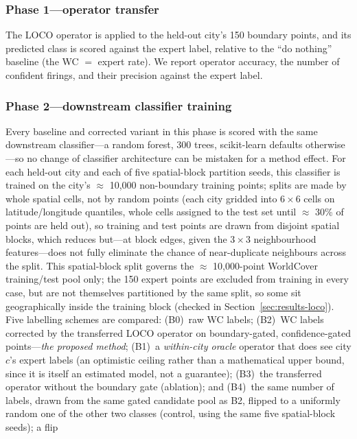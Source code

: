 \documentclass[remotesensing,article,submit,moreauthors]{Definitions/mdpi}
\begin{document}
\subsubsection*{Phase 1---operator transfer}

The LOCO operator is applied to the held-out city's 150 boundary points, and
its predicted class is scored against the expert label, relative to the ``do
nothing'' baseline (the WC $=$ expert rate). We report operator accuracy, the
number of confident firings, and their precision against the expert label.

\subsubsection*{Phase 2---downstream classifier training}

Every baseline and corrected variant in this phase is scored with the same
downstream classifier---a random forest, 300 trees, scikit-learn defaults
otherwise---so no change of classifier architecture can be mistaken for a
method effect. For each held-out city and each of five spatial-block
partition seeds, this classifier is trained on the city's $\approx$ 10,000
non-boundary training points; splits are made by whole spatial cells, not by
random points (each city gridded into $6 \times 6$ cells on
latitude/longitude quantiles, whole cells assigned to the test set until
$\approx$ 30\% of points are held out), so training and test points are drawn
from disjoint spatial blocks, which reduces but---at block edges, given the
$3 \times 3$ neighbourhood features---does not fully eliminate the chance of
near-duplicate neighbours across the split. This spatial-block split governs
the $\approx$ 10,000-point WorldCover training/test pool only; the 150
expert points are excluded from training in every case, but are not
themselves partitioned by the same split, so some sit geographically inside
the training block (checked in Section~\ref{sec:results-loco}). Five
labelling schemes are compared: (B0)~raw WC labels; (B2)~WC labels corrected by the transferred LOCO
operator on boundary-gated, confidence-gated points---\emph{the proposed
method}; (B1)~a \emph{within-city oracle} operator that does see city $c$'s
expert labels (an optimistic ceiling rather than a mathematical upper bound,
since it is itself an estimated model, not a guarantee); (B3)~the transferred
operator without the
boundary gate (ablation); and (B4)~the same number of labels, drawn from the
same gated candidate pool as B2, flipped to a uniformly random one of the
other two classes (control, using the same five spatial-block seeds); a flip
\end{document}
